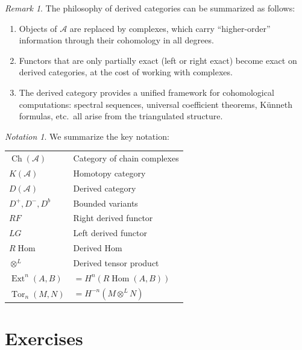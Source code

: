\documentclass[a4paper,12pt]{book}
\DeclareMathOperator{\Hom}{Hom}
\theoremstyle{definition}
\theoremstyle{plain}
\theoremstyle{remark}
\newtheorem{remark}[definition]{Remark}
\newtheorem{notation}[definition]{Notation}
\begin{document}
\begin{remark}\label{rem:derived-cat-philosophy}
The philosophy of derived categories can be summarized as follows:
\begin{enumerate}
    \item Objects of $\mathcal{A}$ are replaced by complexes, which carry ``higher-order''
    information through their cohomology in all degrees.
    \item Functors that are only partially exact (left or right exact) become exact on derived
    categories, at the cost of working with complexes.
    \item The derived category provides a unified framework for cohomological computations:
    spectral sequences, universal coefficient theorems, K\"unneth formulas, etc.\
    all arise from the triangulated structure.
\end{enumerate}
\end{remark}

\begin{notation}\label{not:derived-summary}
We summarize the key notation:
\begin{center}
\renewcommand{\arraystretch}{1.3}
\begin{tabular}{ll}
\hline
$\operatorname{Ch}(\mathcal{A})$ & Category of chain complexes \\
$K(\mathcal{A})$ & Homotopy category \\
$D(\mathcal{A})$ & Derived category \\
$D^+, D^-, D^b$ & Bounded variants \\
$RF$ & Right derived functor \\
$LG$ & Left derived functor \\
$R\Hom$ & Derived Hom \\
$\otimes^L$ & Derived tensor product \\
$\operatorname{Ext}^n(A,B)$ & $= H^n(R\Hom(A,B))$ \\
$\operatorname{Tor}_n(M,N)$ & $= H^{-n}(M \otimes^L N)$ \\
\hline
\end{tabular}
\end{center}
\end{notation}


\section{Exercises}\label{sec:derived-exercises}
\end{document}
